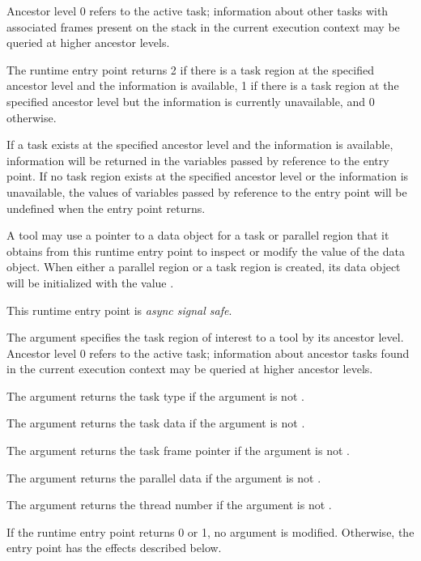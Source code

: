 Ancestor level 0 refers to the active task; information about
other tasks with associated frames present on the stack in the current execution context may be queried at
higher ancestor levels.

The  runtime entry point
returns 2 if there is a task region at the
specified ancestor level
and the information is available, 1 if there is a task region at the
specified ancestor level but the information is currently unavailable,
and 0 otherwise.

If a task exists at the specified ancestor level and the information is available,
information will be returned in the variables passed by reference to the entry
point.  If no task region exists at the specified ancestor level
or the information is unavailable,
the values of variables passed by reference to the entry point will be
undefined when the entry point returns.

A tool may use a pointer to a data object for a task or parallel
region that it obtains from this runtime entry point to inspect or modify the
value of the data object.  When either a parallel region or a task
region is created, its data object will be initialized with the value
.

This runtime entry point is \emph{async signal safe}.

\argdesc

The argument  specifies the task region
of interest to a tool by its ancestor level.  Ancestor level 0 refers
to the active task; information about
ancestor tasks found in the current execution context may be queried at
higher ancestor levels.

The argument  returns the task type
if the argument is not .

The argument  returns the task data
if the argument is not .

The argument  returns the task frame
pointer
if the argument is not .

The argument  returns the parallel data
if the argument is not .

The argument  returns the thread number
if the argument is not .

\effect


If the runtime entry point returns 0 or 1, no argument is modified.
Otherwise, the entry point has the effects described below.

